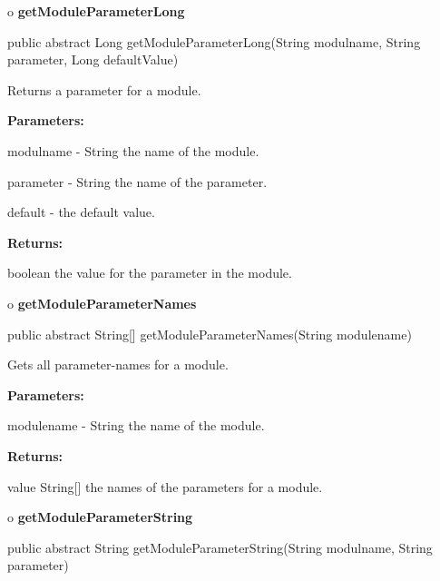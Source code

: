 o {\bf getModuleParameterLong} 

\begin{PRE}
 public abstract Long getModuleParameterLong(String modulname,
                                             String parameter,
                                             Long defaultValue)
\end{PRE}

\begin{description}
\htmlDD Returns a parameter for a module. 

\begin{description}
\item {\bf Parameters:}  

modulname - String the name of the module.  

parameter - String the name of the parameter.  

default - the default value.  
\item {\bf Returns:}  

boolean the value for the parameter in the module.  
\end{description}

\end{description}

o {\bf getModuleParameterNames} 

\begin{PRE}
 public abstract String[] getModuleParameterNames(String modulename)
\end{PRE}

\begin{description}
\htmlDD Gets all parameter-names for a module. 

\begin{description}
\item {\bf Parameters:}  

modulename - String the name of the module.  
\item {\bf Returns:}  

value String[] the names of the parameters for a module.  
\end{description}

\end{description}

o {\bf getModuleParameterString} 

\begin{PRE}
 public abstract String getModuleParameterString(String modulname,
                                                 String parameter)
\end{PRE}

